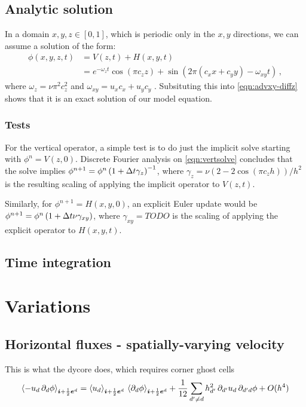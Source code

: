 \documentclass[11pt]{article}
\begin{document}
\subsection{Analytic solution}
In a domain $x,y,z \in [0,1]$, which is periodic only in the $x,y$ 
  directions, we can assume a solution of the form:
\begin{align}
\nonumber
  \phi(x,y,z,t) & = V(z,t) + H(x,y,t) \\
\label{eqn:exact}
  & = e^{-\omega_z t} \cos(\pi c_z z)
    + \sin(2\pi (c_x x + c_y y) - \omega_{xy} t) \, ,
\end{align}
  where $\omega_z = \nu \pi^2 c_z^2$ and 
  $\omega_{xy} = u_x c_x + u_y c_y$ .
Subsituting this into \eqref{eqn:advxy-diffz} shows that it is an exact
  solution of our model equation.

\subsubsection{Tests}
For the vertical operator, a simple test is to do just the 
  implicit solve starting with $\phi^n = V(z,0)$.
Discrete Fourier analysis on \eqref{eqn:vertsolve} concludes that
  the solve implies $\phi^{n+1} = \phi^n \left(1 + {\Delta t} \gamma_z \right)^{-1}$,
  where $\gamma_z = \nu (2 - 2 \cos(\pi c_z h)) / h^2$ is the
  resulting scaling of applying the implicit operator to $V(z,t)$.

Similarly, for $\phi^{n+1} = H(x,y,0)$, an explicit Euler update would be
  $\phi^{n+1} = \phi^n \left(1 + {\Delta t} \nu \gamma_{xy} \right)$,
  where $\gamma_{xy} = TODO $ is the
  scaling of applying the explicit operator to $H(x,y,t)$.

\subsection{Time integration}

\section{Variations}

\subsection{Horizontal fluxes - spatially-varying velocity}
This is what the dycore does, which requires corner ghost cells
\begin{equation}
  \left\langle - u_d \, \partial_d \phi \right\rangle_{{\boldsymbol{i}}+\frac{1}{2}{\boldsymbol{e}}^d} = \left\langle u_d \right\rangle_{{\boldsymbol{i}}+\frac{1}{2}{\boldsymbol{e}}^d} 
    \, \left\langle \partial_d \phi \right\rangle_{{\boldsymbol{i}}+\frac{1}{2}{\boldsymbol{e}}^d} + 
  \frac{1}{12}\sum_{d'\neq d}
  h_{d'}^2 \, {\partial_{d'} u_d} \, {\partial_{d' d} \phi}  +
  O(h^4) \\
\end{equation}
\end{document}
